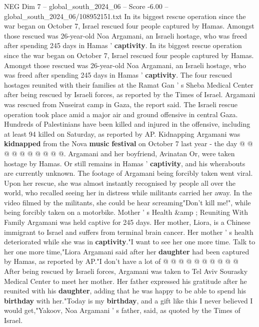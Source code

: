 \begin{textsample}{NEG Dim 7 – global\_south\_2024\_06 – Score -6.00 – global\_south\_2024\_06/108952151.txt}  \label{ex:f7_neg_364}
In its biggest rescue operation since the war began on October 7, Israel rescued four people captured by Hamas.
Amongst those rescued was 26-year-old Noa Argamani, an Israeli hostage, who was freed after spending 245 days in Hamas ' \textbf{captivity}.
In its biggest rescue operation since the war began on October 7, Israel rescued four people captured by Hamas.
Amongst those rescued was 26-year-old Noa Argamani, an Israeli hostage, who was freed after spending 245 days in Hamas ' \textbf{captivity}.
The four rescued hostages reunited with their families at the Ramat Gan ' s Sheba Medical Center after being rescued by Israeli forces, as reported by the Times of Israel.
Argamani was rescued from Nuseirat camp in Gaza, the report said.
The Israeli rescue operation took place amid a major air and ground offensive in central Gaza.
Hundreds of Palestinians have been killed and injured in the offensive, including at least 94 killed on Saturday, as reported by AP.
Kidnapping Argamani was \textbf{kidnapped} from the Nova \textbf{music} \textbf{festival} on October 7 last year - the day @ @ @ @ @ @ @ @ @ @.
Argamani and her boyfriend, Avinatan Or, were taken hostage by Hamas.
Or still remains in Hamas ' \textbf{captivity}, and his wherabouts are currently unknown.
The footage of Argamani being forcibly taken went viral.
Upon her rescue, she was almost instantly recognised by people all over the world, who recalled seeing her in distress while militants carried her away.
In the video filmed by the militants, she could be hear screaming"Don't kill me!", while being forcibly taken on a motorbike.
Mother ' s Health \&amp ; Reuniting With Family Argamani was held captive for 245 days.
Her mother, Liora, is a Chinese immigrant to Israel and suffers from terminal brain cancer.
Her mother ' s health deteriorated while she was in \textbf{captivity}."I want to see her one more time.
Talk to her one more time,"Liora Argamani said after her \textbf{daughter} had been captured by Hamas, as reported by AP."I don't have a lot of @ @ @ @ @ @ @ @ @ @ After being rescued by Israeli forces, Argamani was taken to Tel Aviv Sourasky Medical Center to meet her mother.
Her father expressed his gratitude after he reunited with his \textbf{daughter}, adding that he was happy to be able to spend his \textbf{birthday} with her."Today is my \textbf{birthday}, and a gift like this I never believed I would get,"Yakoov, Noa Argamani ' s father, said, as quoted by the Times of Israel.

\end{textsample}
